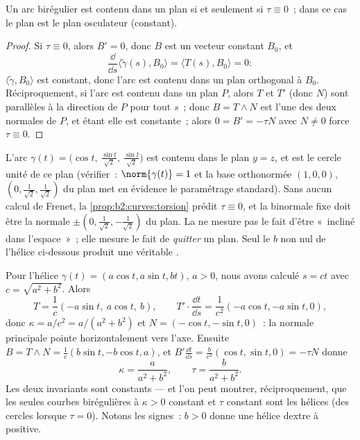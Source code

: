 \begin{proposition}\label{prop:b2:curves:torsion}
Un arc birégulier est contenu dans un plan si et seulement si
$\tau \equiv 0$~; dans ce cas le plan est le plan osculateur
(constant).
\end{proposition}

\begin{proof}
Si $\tau \equiv 0$, alors $B' = 0$, donc $B$ est un vecteur
 constant $B_0$, et
\[
\frac{\dd}{\dd s}\langle \tilde\gamma(s), B_0\rangle
= \langle T(s), B_0\rangle = 0 :
\]
$\langle \tilde\gamma, B_0\rangle$ est constant, donc l'arc est
contenu dans un plan orthogonal à $B_0$. Réciproquement, si l'arc
est contenu dans un plan $P$,
alors $T$ et $T'$ (donc $N$) sont parallèles à la direction de
$P$ pour tout $s$~; donc $B = T \wedge N$ est l'une des deux
normales  de $P$, et étant  elle est constante~;
alors $0 = B' = -\tau N$ avec $N \neq 0$ force $\tau \equiv 0$.
\end{proof}

\begin{example}
L'arc $\gamma(t) = \bigl(\cos t,\ \tfrac{\sin t}{\sqrt2},\
\tfrac{\sin t}{\sqrt2}\bigr)$ est contenu dans le plan $y = z$, et
est le cercle unité de ce plan (vérifier~: $\norm{\gamma(t)} =
1$ et la base orthonormée $(1,0,0)$,
$(0, \tfrac1{\sqrt2}, \tfrac1{\sqrt2})$ du plan met en évidence le
paramétrage standard). Sans aucun calcul de Frenet,
la \cref{prop:b2:curves:torsion} prédit $\tau \equiv 0$, et
la binormale fixe doit être la normale  $\pm(0,
\tfrac1{\sqrt2}, -\tfrac1{\sqrt2})$ du plan. La \omterm{thm:b2:curves:frenet3d}{torsion} ne mesure
pas le fait d'être «~incliné dans l'espace~»~; elle mesure le fait
de \emph{quitter} un plan. Seul le $b$ non nul de l'hélice
ci-dessous produit une véritable .
\end{example}

\begin{example}[L'hélice]\label{ex:b2:curves:helixfrenet}
Pour l'hélice $\gamma(t) = (a\cos t, a\sin t, bt)$, $a > 0$, nous
avons calculé $s = ct$ avec $c = \sqrt{a^2 + b^2}$. Alors
\[
T = \frac1c(-a\sin t,\ a\cos t,\ b),
\qquad
T' \cdot \frac{\dd t}{\dd s}
= \frac{1}{c^2}(-a\cos t, -a\sin t, 0),
\]
donc $\kappa = a/c^2 = a/(a^2 + b^2)$ et $N = (-\cos t, -\sin t,
0)$~: la normale principale pointe horizontalement vers l'axe.
Ensuite $B = T \wedge N = \frac1c(b\sin t, -b\cos t, a)$, et $B'
\frac{\dd t}{\dd s} = \frac{b}{c^2}(\cos t, \sin t, 0) = -\tau N$
donne
\[
\boxed{\ \kappa = \frac{a}{a^2 + b^2}, \qquad
\tau = \frac{b}{a^2 + b^2}. \ }
\]
Les deux invariants sont constants --- et l'on peut montrer,
réciproquement, que les seules courbes birégulières à $\kappa > 0$
constant et $\tau$ constant sont les hélices (des cercles lorsque
$\tau = 0$). Notons les signes~: $b >
0$ donne une hélice dextre à  positive.
\end{example}

